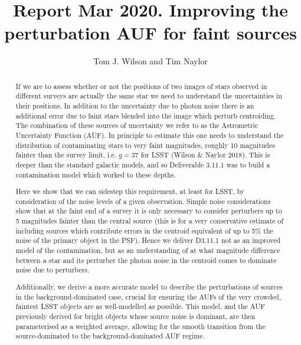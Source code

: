 \documentclass[fleqn,usenatbib]{mnras}
\title[]{Report Mar 2020.  Improving the perturbation AUF for faint sources}
\author[Tom J. Wilson and Tim Naylor]{
Tom J. Wilson
and Tim Naylor
\\
}
\date{}
\begin{document}
\label{firstpage}
\pagerange{\pageref{firstpage}--\pageref{lastpage}}
\maketitle
\begin{abstract}

If we are to assess whether or not the positions of two images of stars observed in different surveys are actually the same star we need to understand the uncertainties in their positions.  In addition to the uncertainty due to photon noise there is an additional error due to faint stars blended into the image which perturb centroiding.  The combination of these sources of uncertainty we refer to as the Astrometric Uncertainty Function (AUF).  In principle to estimate this one needs to understand the distribution of contaminating stars to very faint magnitudes, roughly 10 magnitudes fainter than the survey limit, i.e. $g=37$ for LSST (Wilson \& Naylor 2018).  This is deeper than the standard galactic models, and so Deliverable 3.11.1 was to build a contamination model which worked to these depths.

Here we show that we can sidestep this requirement, at least for LSST, by consideration of the noise levels of a given observation.  Simple noise considerations show that at the faint end of a survey it is only necessary to consider perturbers up to 5 magnitudes fainter than the central source (this is for a very conservative estimate of including sources which contribute errors in the centroid equivalent of up to 5\% the noise of the primary object in the PSF).  
Hence we deliver D3.11.1 not as an improved model of the contamination, but as an understanding of at what magnitude difference between a star and its perturber the photon noise in the centroid comes to dominate noise due to perturbers.

Additionally, we derive a more accurate model to describe the perturbations of sources in the background-dominated case, crucial for ensuring the AUFs of the very crowded, faintest LSST objects are as well-modelled as possible. This model, and the AUF previously derived for bright objects whose source noise is dominant, are then parameterised as a weighted average, allowing for the smooth transition from the source-dominated to the background-dominated AUF regime.  

\end{abstract}
\end{document}
